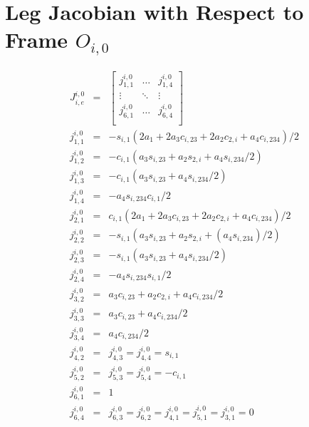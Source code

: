 \chapter{Leg Jacobian with Respect to Frame $O_{i,0}$}
\label{appendix::a}
	\vspace{-10mm}
	\begin{eqnarray*}
		J^{i,0}_{i,e} &=& 
		\left[
			\begin{array}{ccc}
				j_{1,1}^{i,0}	& \ldots 		& j_{1,4}^{i,0} 	\\
				\vdots 			& \ddots 		& \vdots 			\\
				j_{6,1}^{i,0}	& \ldots 	 	& j_{6,4}^{i,0} 	\\
			\end{array}
		\right]\\
		j_{1,1}^{i,0} &=& -s_{i,1} (2 a_{1} + 2 a_{3} c_{i,23} + 2 a_{2} c_{2,i} + a_{4} c_{i,234})/2\nonumber\\
		j_{1,2}^{i,0} &=& -c_{i,1} (a_{3} s_{i,23} + a_{2} s_{2,i} + a_{4} s_{i,234}/2)				\nonumber\\
		j_{1,3}^{i,0} &=& -c_{i,1} (a_{3} s_{i,23} + a_{4} s_{i,234}/2)								\nonumber\\
		j_{1,4}^{i,0} &=& -a_{4} s_{i,234} c_{i,1}/2 												\nonumber\\
		j_{2,1}^{i,0} &=& c_{i,1} (2 a_{1} + 2 a_{3} c_{i,23} + 2 a_{2} c_{2,i} + a_{4} c_{i,234})/2\nonumber\\
		j_{2,2}^{i,0} &=& -s_{i,1} (a_{3} s_{i,23} + a_{2} s_{2,i} + (a_{4} s_{i,234})/2)				\nonumber\\
		j_{2,3}^{i,0} &=& -s_{i,1} (a_{3} s_{i,23} + a_{4} s_{i,234}/2)								\nonumber\\
		j_{2,4}^{i,0} &=& -a_{4} s_{i,234} s_{i,1}/2 												\nonumber\\
		j_{3,2}^{i,0} &=& a_{3} c_{i,23} + a_{2} c_{2,i} + a_{4} c_{i,234}/2						\nonumber\\
		j_{3,3}^{i,0} &=& a_{3} c_{i,23} + a_{4} c_{i,234}/2										\nonumber\\
		j_{3,4}^{i,0} &=& a_{4} c_{i,234}/2 														\nonumber\\
		j_{4,2}^{i,0} &=& j_{4,3}^{i,0} = j_{4,4}^{i,0} = s_{i,1}									\nonumber\\
		j_{5,2}^{i,0} &=& j_{5,3}^{i,0}	= j_{5,4}^{i,0}	= -c_{i,1}									\nonumber\\
		j_{6,1}^{i,0} &=& 1																			\nonumber\\
		j_{6,4}^{i,0} &=& j_{6,3}^{i,0} = j_{6,2}^{i,0} = j_{4,1}^{i,0} = j_{5,1}^{i,0} = j_{3,1}^{i,0} = 0															\nonumber\\
		\label{eq::leg_jacobian}
	\end{eqnarray*}

